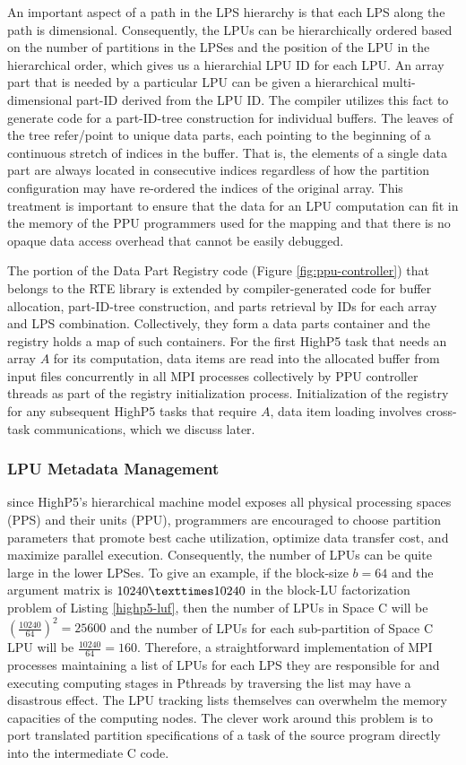 \documentclass[ASNA,twocolumn]{USG} %
\begin{document}
{An important aspect of a path in the LPS hierarchy is that each LPS along the path is dimensional. Consequently, the LPUs can be hierarchically ordered based on the number of partitions in the LPSes and the position of the LPU in the hierarchical order, which gives us a hierarchial LPU ID for each LPU. An array part that is needed by a particular LPU can be given a hierarchical multi-dimensional part-ID derived from the LPU ID. The compiler utilizes this fact to generate code for a part-ID-tree construction for individual buffers. The leaves of the tree refer/point to unique data parts, each pointing to the beginning of a continuous stretch of indices in the buffer. That is, the elements of a single data part are always located in consecutive indices regardless of how the partition configuration may have re-ordered the indices of the original array. This treatment is important to ensure that the data for an LPU computation can fit in the memory of the PPU programmers used for the mapping and that there is no opaque data access overhead that cannot be easily debugged.    

The portion of the Data Part Registry code (Figure \ref{fig:ppu-controller}) that belongs to the RTE library is extended by compiler-generated code for buffer allocation, part-ID-tree construction, and parts retrieval by IDs for each array and LPS combination. Collectively, they form a data parts container and the registry holds a map of such containers. For the first HighP5 task that needs an array $A$ for its computation, data items are read into the allocated buffer from input files concurrently in all MPI processes collectively by PPU controller threads as part of the registry initialization process. Initialization of the registry for any subsequent HighP5 tasks that require $A$, data item loading involves cross-task communications, which we discuss later. 

\subsubsection{LPU Metadata Management}
\label{subsec:lpu-data-mgmt}
since HighP5's hierarchical machine model exposes all physical processing spaces (PPS) and their units (PPU), programmers are encouraged to choose partition parameters that promote best cache utilization, optimize data transfer cost, and maximize parallel execution. Consequently, the number of LPUs can be quite large in the lower LPSes. To give an example, if the block-size $b = 64$ and the argument matrix is $10240 \texttimes 10240$ in the block-LU factorization problem of Listing \ref{highp5-luf}, then the number of LPUs in Space C will be $(\frac{10240}{64})^2 = 25600$ and the number of LPUs for each sub-partition of Space C LPU will be $\frac{10240}{64}=160$. Therefore, a straightforward implementation of MPI processes maintaining a list of LPUs for each LPS they are responsible for and executing computing stages in Pthreads by traversing the list may have a disastrous effect. The LPU tracking lists themselves can overwhelm the memory capacities of the computing nodes. The clever work around this problem is to port translated partition specifications of a task of the source program directly into the intermediate C code.

}
\end{document}
